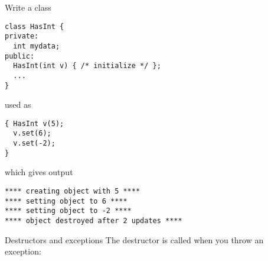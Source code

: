 \begin{exercise}
  \label{ex:destruct-trace}
  Write a class
\begin{verbatim}
class HasInt {
private:
  int mydata;
public:
  HasInt(int v) { /* initialize */ };
  ...
}
\end{verbatim}
used as
\begin{verbatim}
{ HasInt v(5);
  v.set(6);
  v.set(-2);
}
\end{verbatim}
which gives output
\begin{verbatim}
**** creating object with 5 ****
**** setting object to 6 ****
**** setting object to -2 ****
**** object destroyed after 2 updates ****
\end{verbatim}
\end{exercise}

\begin{block}{Destructors and exceptions}
  \label{sl:exceptobj}
  The destructor is called when you throw an exception:
\end{block}




